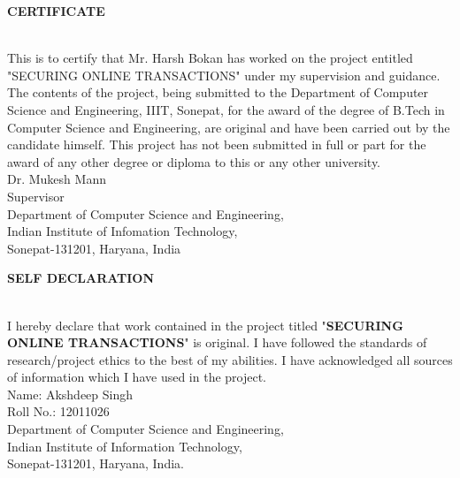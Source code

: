 \documentclass[12pt, oneside, a4paper]{article}
\begin{document}
\begin{center}
    \begin{Large}\textbf{CERTIFICATE}\end{Large}
\end{center}\\
\vspace{1cm}
This is to certify that Mr. Harsh Bokan has worked on the project entitled "SECURING ONLINE TRANSACTIONS" under my supervision and guidance.
\vspace{0.5cm}\\
The contents of the project, being submitted to the Department of Computer Science and Engineering, IIIT, Sonepat, for the award of the degree of B.Tech in Computer Science and Engineering, are original and have been carried out by the candidate himself. This project has not been submitted in full or part for the award of any other degree or diploma to this or any other university.
\vspace{4cm}\\
Dr. Mukesh Mann\\
Supervisor
\vspace{5cm}\\
Department of Computer Science and Engineering,\\
Indian Institute of Infomation Technology,\\
Sonepat-131201, Haryana, India
\pagebreak

\begin{center}
    \begin{Large}\textbf{SELF DECLARATION}\end{Large}
\end{center}\\
\vspace{1cm}
I hereby declare that work contained in the project titled "\textbf{SECURING ONLINE TRANSACTIONS}" is original. I have followed the standards of research/project ethics to the best of my abilities. I have acknowledged all sources of information which I have used in the project.
\vspace{4cm}\\
Name: Akshdeep Singh\\
Roll No.: 12011026\\
Department of Computer Science and Engineering,\\
Indian Institute of Information Technology,\\
Sonepat-131201, Haryana, India.
\pagebreak
\end{document}

